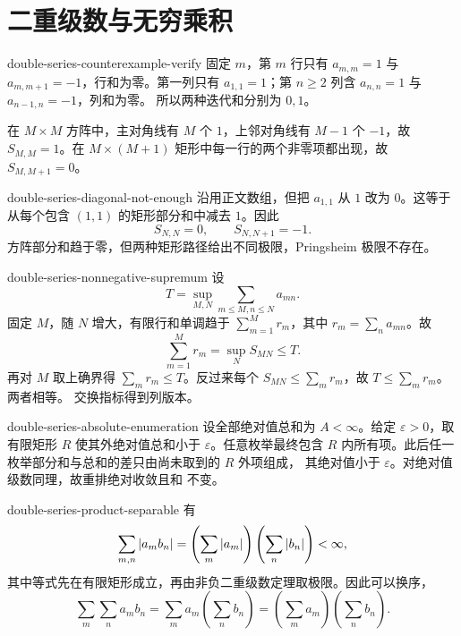 \chapter{二重级数与无穷乘积}
\label{chap:double-series-infinite-products-solutions}

\begin{solution}{double-series-counterexample-verify}
固定 \(m\)，第 \(m\) 行只有 \(a_{m,m}=1\) 与
\(a_{m,m+1}=-1\)，行和为零。第一列只有 \(a_{1,1}=1\)；第
\(n\ge2\) 列含 \(a_{n,n}=1\) 与 \(a_{n-1,n}=-1\)，列和为零。
所以两种迭代和分别为 \(0,1\)。

在 \(M\times M\) 方阵中，主对角线有 \(M\) 个 \(1\)，上邻对角线有
\(M-1\) 个 \(-1\)，故 \(S_{M,M}=1\)。在 \(M\times(M+1)\)
矩形中每一行的两个非零项都出现，故 \(S_{M,M+1}=0\)。
\end{solution}

\begin{solution}{double-series-diagonal-not-enough}
沿用正文数组，但把 \(a_{1,1}\) 从 \(1\) 改为 \(0\)。这等于从每个包含
\((1,1)\) 的矩形部分和中减去 \(1\)。因此
\[
 S_{N,N}=0,\qquad S_{N,N+1}=-1.
\]
方阵部分和趋于零，但两种矩形路径给出不同极限，Pringsheim 极限不存在。
\end{solution}

\begin{solution}{double-series-nonnegative-supremum}
设
\[
 T=\sup_{M,N}\sum_{m\le M,n\le N}a_{mn}.
\]
固定 \(M\)，随 \(N\) 增大，有限行和单调趋于
\(\sum_{m=1}^M r_m\)，其中 \(r_m=\sum_na_{mn}\)。故
\[
 \sum_{m=1}^M r_m=\sup_NS_{MN}\le T.
\]
再对 \(M\) 取上确界得 \(\sum_mr_m\le T\)。反过来每个
\(S_{MN}\le\sum_mr_m\)，故 \(T\le\sum_mr_m\)。两者相等。
交换指标得到列版本。
\end{solution}

\begin{solution}{double-series-absolute-enumeration}
设全部绝对值总和为 \(A<\infty\)。给定 \(\varepsilon>0\)，取有限矩形
\(R\) 使其外绝对值总和小于 \(\varepsilon\)。任意枚举最终包含 \(R\)
内所有项。此后任一枚举部分和与总和的差只由尚未取到的 \(R\) 外项组成，
其绝对值小于 \(\varepsilon\)。对绝对值级数同理，故重排绝对收敛且和
不变。
\end{solution}

\begin{solution}{double-series-product-separable}
有
\[
 \sum_{m,n}\left|a_mb_n\right|
 =\left(\sum_m\left|a_m\right|\right)
  \left(\sum_n\left|b_n\right|\right)<\infty,
\]
其中等式先在有限矩形成立，再由非负二重级数定理取极限。因此可以换序，
\[
 \sum_m\sum_n a_mb_n
 =\sum_m a_m\left(\sum_n b_n\right)
 =\left(\sum_ma_m\right)\left(\sum_nb_n\right).
\]
\end{solution}

